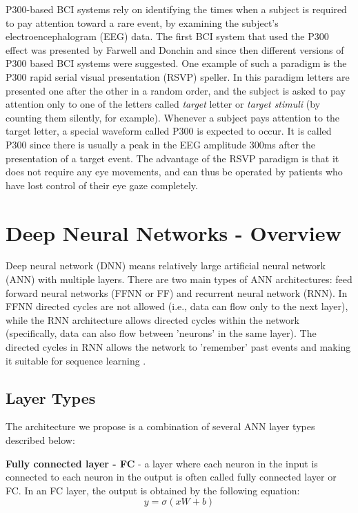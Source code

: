 \documentclass[
12pt, %
english, %
doublespacing, %
headsepline, %
]{MastersDoctoralThesis} %
\begin{document}
P300-based BCI systems rely on identifying the times when a subject is required to pay attention toward a rare event, by examining the subject's electroencephalogram (EEG) data. The first BCI system that used the P300 effect was presented by Farwell and Donchin \cite{FirstP300} and since then different versions of P300 based BCI systems were suggested. One example of such a paradigm is the P300 rapid serial visual presentation (RSVP) speller. In this paradigm letters are presented one after the other in a random order, and the subject is asked to pay attention only to one of the letters called \textit{target} letter or \textit{target stimuli} (by counting them silently, for example). Whenever a subject pays attention to the target letter, a special waveform called P300 is expected to occur. It is called P300 since there is usually a peak in the EEG amplitude 300ms after the presentation of a target event. The advantage of the RSVP paradigm is that it does not require any eye movements, and can thus be operated by patients who have lost control of their eye gaze completely.

\section{Deep Neural Networks - Overview}


Deep neural network (DNN) means relatively large artificial neural network (ANN) with multiple layers. There are two main types of ANN architectures: feed forward neural networks (FFNN or FF) and recurrent neural network (RNN). In FFNN directed cycles are not allowed (i.e., data can flow only to the next layer), while the RNN architecture allows directed cycles within the network (specifically, data can also flow between 'neurons' in the same layer). The directed cycles in RNN allows the network to 'remember' past events and making it suitable for sequence learning \cite{rumelhart1985learning}.

\subsection{Layer Types}
The architecture we propose is a combination of several ANN layer types described below:

\textbf{Fully connected layer - FC} - a layer where each neuron in the input is connected to each neuron in the output is often called fully connected layer or FC. In an FC layer, the output is obtained by the following equation:
\[y=\sigma \left( {xW + b} \right)\]
\end{document}
